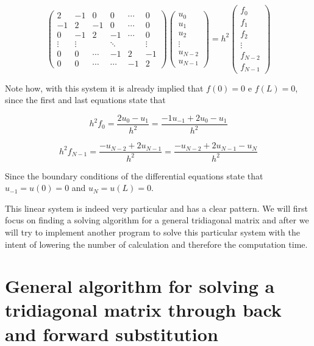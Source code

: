 \documentclass {article}
\begin{document}
\begin{equation}
 \begin{pmatrix}
   2 & -1 &  0 & 0 & \cdots & 0  \\
  -1 &  2 & -1 & 0 & \cdots & 0  \\
   0 &-1 &  2 & -1 & \cdots & 0 \\
  \vdots  & \vdots  & & \ddots & & \vdots   \\
   0 &  0 & \cdots  & -1 & 2 & -1 \\
   0 &  0 & \cdots & \cdots  & -1 & 2
 \end{pmatrix}
 \begin{pmatrix}
  u_0 \\
  u_1 \\
  u_2 \\
  \vdots  \\
  u_{N-2} \\
  u_{N-1} 
 \end{pmatrix}
 = h^2
 \begin{pmatrix}
  f_0 \\
  f_1 \\
  f_2 \\
  \vdots  \\
  f_{N-2} \\
  f_{N-1} 
 \end{pmatrix}
\end{equation}

Note how, with this system it is already implied that $f(0)=0$ e $f(L)=0$, since the first and last equations state that

$$h^2 f_0=\frac{2 u_0-u_1}{h^2}=\frac{-1 u_{-1}+2 u_0-u_1}{h^2}$$

$$h^2 f_{N-1}=\frac{-u_{N-2}+2 u_{N-1}}{h^2}=\frac{-u_{N-2}+2 u_{N-1}-u_N}{h^2}$$ 

Since the boundary conditions of the differential equations state that $u_{-1}=u(0)=0$ and $u_{N}=u(L)=0$.  

This linear system is indeed very particular and has a clear pattern. We will first focus on finding a solving algorithm for a general tridiagonal matrix and after we will try to implement another program to solve this particular system with the intent of lowering the number of calculation and therefore the computation time.

\section{General algorithm for solving a tridiagonal matrix through back and forward substitution}
\end{document}
